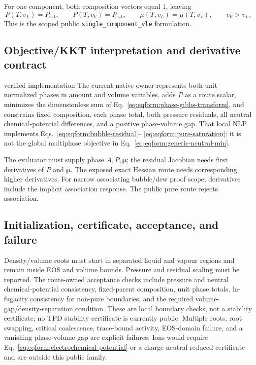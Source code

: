 \documentclass[11pt]{article}
\newcommand{\Evidence}[1]{\textsf{#1}}
\begin{document}
For one component, both composition vectors equal \(1\), leaving
\begin{equation}
 P(T,v_L)=P_{\mathrm{sat}},\qquad
 P(T,v_V)=P_{\mathrm{sat}},\qquad
 \mu(T,v_L)=\mu(T,v_V),\qquad v_V>v_L.
\label{eq:eqform:pure-saturation}
\end{equation}
This is the scoped public \texttt{single\_component\_vle} formulation.

\subsection{Objective/KKT interpretation and derivative contract}

\Evidence{verified implementation}
The current native owner represents both unit-normalized phases in amount and
volume variables, adds \(P\) as a route scalar, minimizes the dimensionless sum
of Eq.~\eqref{eq:eqform:phase-gibbs-transform}, and constrains fixed
composition, each phase total, both pressure residuals, all neutral
chemical-potential differences, and a positive phase-volume gap. That local
NLP implements Eqs.~\eqref{eq:eqform:bubble-residual}--%
\eqref{eq:eqform:pure-saturation}; it is not the global multiphase objective in
Eq.~\eqref{eq:eqform:generic-neutral-min}.

The evaluator must supply phase \(A,P,\boldsymbol\mu\); the residual Jacobian
needs first derivatives of \(P\) and \(\boldsymbol\mu\). The exposed exact
Hessian route needs corresponding higher derivatives. For narrow associating
bubble/dew proof scope, derivatives include the implicit association response.
The public pure route rejects association.

\subsection{Initialization, certificate, acceptance, and failure}

Density/volume roots must start in separated liquid and vapour regions and
remain inside EOS and volume bounds. Pressure and residual scaling must be
reported. The route-owned acceptance checks include pressure and neutral
chemical-potential consistency, fixed-parent composition, unit phase totals,
ln-fugacity consistency for non-pure boundaries, and the required
volume-gap/density-separation condition. These are local boundary checks, not a
stability certificate; no TPD stability certificate is currently public.
Multiple roots, root swapping, critical coalescence, trace-bound activity,
EOS-domain failure, and a vanishing phase-volume gap are explicit failures.
Ions would require
Eq.~\eqref{eq:eqform:electrochemical-potential} or a charge-neutral reduced
certificate and are outside this public family.
\end{document}

